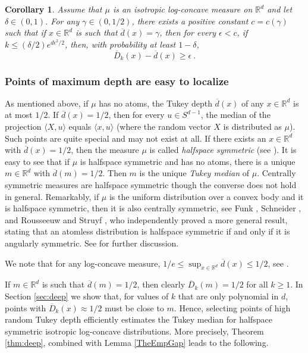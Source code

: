 \documentclass[12pt]{article}
\newcommand{\R}{\mathbb{R}}
\newcommand{\ol}{\overline}
\newtheorem{corollary}[theorem]{Corollary}
\begin{document}
\begin{tcolorbox}
\begin{corollary}
\label{cor:intermediate}
Assume that $\mu$ is an isotropic log-concave measure on $\R^d$ and let $\delta \in (0,1)$.
For any $\gamma \in (0,1/2)$, there exists a positive constant $c=c(\gamma)$ such that
if $x\in\R^d$ is such that $\ol{d}(x)=\gamma$, then
for every $\epsilon < c$, if $k \le (\delta/2) e^{d\epsilon^2 /2}$, then, with probability
at least $1-\delta$,
\[
     \ol{D}_k(x) - \ol{d}(x) \ge \epsilon~.
\]
\end{corollary}
\end{tcolorbox}




\subsubsection*{Points of maximum depth are easy to localize}

As mentioned above, if $\mu$ has no atoms,  the Tukey depth $\ol{d}(x)$ of any $x\in \R^d$ is at most $1/2$.
If $\ol{d}(x)=1/2$, then for every $u\in S^{d-1}$, the median of the projection $\langle X, u \rangle$
equals $\langle x, u \rangle$ (where the random vector $X$ is distributed as $\mu$).
Such points are quite special and may not exist at all. If there exists an $x\in \R^d$ with $\ol{d}(x)=1/2$,
then the measure $\mu$ is called \emph{halfspace symmetric} (see
\cite{ZuSe00a,NaScWe19}).
It is easy to see that if $\mu$ is halfspace symmetric and has no atoms, there is a
unique $m\in \R^d$ with $\ol{d}(m)=1/2$. Then $m$ is the unique \emph{Tukey
  median} of $\mu$.
Centrally symmetric measures are halfspace symmetric though the converse does not hold in general.
Remarkably, if $\mu$ is the uniform distribution over a convex body and it is halfspace symmetric,
then it is also centrally symmetric, see  Funk \cite{Fun15},
Schneider \cite{Sch70},  and 
Rousseeuw and Struyf \cite{MR2057920}, who independently proved a more
general result, stating that an atomless distribution is halfspace symmetric if and only if it is angularly symmetric.
See \cite{NaScWe19} for further discussion.



We note that for any log-concave measure, $1/e \le \sup_{x\in \R^d} \ol{d}(x) \le 1/2$, see
\cite[Theorem 3]{NaScWe19}.

If $m\in \R^d$ is such that $\ol{d}(m)=1/2$, then clearly $\ol{D}_k(m)=1/2$ for all $k\ge 1$.
In Section \ref{sec:deep} we show that, for values of $k$ that are only polynomial in $d$, points
with $\ol{D}_k(x) \approx 1/2$ must be close to $m$. Hence, selecting points of high random Tukey depth
efficiently estimates the Tukey median for halfspace symmetric isotropic log-concave distributions.
More precisely, Theorem \ref{thm:deep}, combined with Lemma \ref{TheEmpGap} leads to the following.
\end{document}
